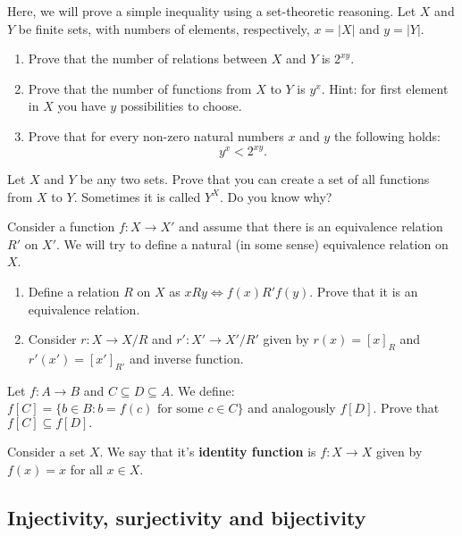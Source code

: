 \begin{exercise}
  Here, we will prove a simple inequality using a set-theoretic reasoning. Let $X$ and $Y$ be finite sets, with numbers of elements, respectively, $x=|X|$ and $y=|Y|$.
  \begin{enumerate}
    \item Prove that the number of relations between $X$ and $Y$ is $2^{xy}$.
    \item Prove that the number of functions from $X$ to $Y$ is $y^x$. Hint: for first element in $X$ you have $y$ possibilities to choose.
    \item Prove that for every non-zero natural numbers $x$ and $y$ the following holds:
      $$y^x<2^{xy}.$$
  \end{enumerate}
\end{exercise}

\begin{exercise}
  Let $X$ and $Y$ be any two sets. Prove that you can create a set of all functions from $X$ to $Y$. Sometimes it is called $Y^X$. Do you know why?
\end{exercise}

\begin{exercise}
  Consider a function $f: X\to X'$ and assume that there is an equivalence relation $R'$ on $X'$. We will try to define a natural (in some sense) equivalence relation on $X$.
  \begin{enumerate}
    \item Define a relation $R$ on $X$ as $xRy\Leftrightarrow f(x) R' f(y)$. Prove that it is an equivalence relation.
    \item Consider $r: X\to X/R$ and $r': X'\to X'/R'$ given by $r(x)=[x]_R$ and $r'(x')=[x']_{R'}$ and inverse function.
  \end{enumerate}
\end{exercise}

\begin{prob}
	Let $f: A\to B$ and $C\subseteq D\subseteq A$. We define: $f[C] = \{b\in B : b=f(c) \text{ for some }c\in C \}$ and analogously $f[D]$. Prove that
	$f[C]\subseteq f[D].$
\end{prob}

\begin{definition}
  Consider a set $X$. We say that it's \textbf{identity function} is $f:X\to X$ given by $f(x)=x$ for all $x\in X$.
\end{definition}

\subsection{Injectivity, surjectivity and bijectivity}

